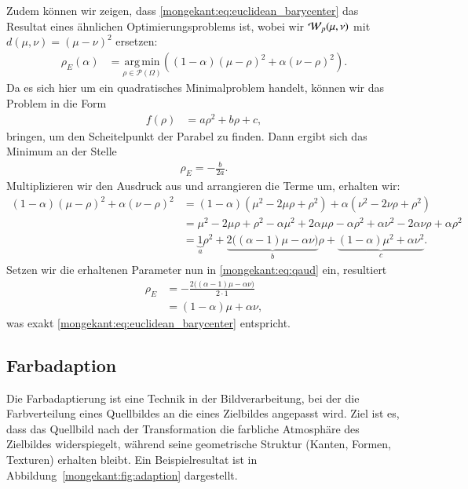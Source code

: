 Zudem können wir zeigen,
dass \eqref{mongekant:eq:euclidean_barycenter} das Resultat eines ähnlichen Optimierungsproblems ist,
wobei wir $\wasserstein(\mu, \nu)$ mit $d(\mu, \nu) = (\mu - \nu)^2$ ersetzen:
\begin{align*}
\rho_E(\alpha)
&=
\underset{\rho \in \mathcal{P}(\Omega)}{\mathrm{arg\,min}}\left(
(1-\alpha) (\mu - \rho)^2
+ \alpha (\nu - \rho)^2
\right)
.
\end{align*}
Da es sich hier um ein quadratisches Minimalproblem handelt,
können wir das Problem in die Form
\begin{align*}
f(\rho)
&=
a \rho^2 + b \rho + c
,
\end{align*}
bringen,
um den Scheitelpunkt der Parabel zu finden.
Dann ergibt sich das Minimum an der Stelle
\begin{align}
\rho_E
=
-\frac{b}{2a}
\label{mongekant:eq:qaud}
.
\end{align}
Multiplizieren wir den Ausdruck aus und 
arrangieren die Terme um,
erhalten wir:
\begin{align*}
(1 - \alpha) (\mu - \rho)^2 
+ \alpha (\nu - \rho)^2
&=
(1 - \alpha) \left(\mu^2 - 2\mu\rho + \rho^2 \right)
+ \alpha \left(\nu^2 - 2\nu\rho + \rho^2 \right)
\\
&=
\mu^2 - 2\mu\rho + \rho^2 - \alpha \mu^2 + 2\alpha\mu\rho - \alpha\rho^2 
+ \alpha \nu^2 - 2\alpha\nu\rho + \alpha\rho^2
\\
&=
\underbrace{1}_{\displaystyle a} \rho^2 
+ \underbrace{2 \bigl((\alpha - 1) \mu - \alpha\nu \bigr)}_{\displaystyle b} \rho
+ \underbrace{(1 - \alpha) \mu^2 + \alpha \nu^2}_{\displaystyle c}
.
\end{align*}
Setzen wir die erhaltenen Parameter nun in \eqref{mongekant:eq:qaud} ein,
resultiert
\begin{align*}
\rho_E
&=
-\frac{2 \bigl(\left(\alpha - 1\right) \mu - \alpha\nu \bigr)}{2 \cdot 1}
\\
&=
(1 - \alpha) \mu + \alpha \nu
,
\end{align*}
was exakt \eqref{mongekant:eq:euclidean_barycenter} entspricht.

\subsection{Farbadaption\label{mongekant:subsection:farbadaption}}

Die Farbadaptierung ist eine Technik in der Bildverarbeitung,
%
bei der die Farbverteilung eines Quellbildes an die eines Zielbildes angepasst wird.
%
Ziel ist es,
dass das Quellbild nach der Transformation
die farbliche Atmosphäre des Zielbildes widerspiegelt,
%
während seine geometrische Struktur (Kanten, Formen, Texturen) erhalten bleibt.
Ein Beispielresultat ist in Abbildung~\ref{mongekant:fig:adaption} dargestellt.

